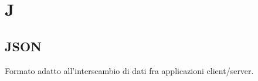 \section{J}
	\subsection{JSON}
		 Formato adatto all'interscambio di dati fra applicazioni client/server.
		 
		 
\newpage
